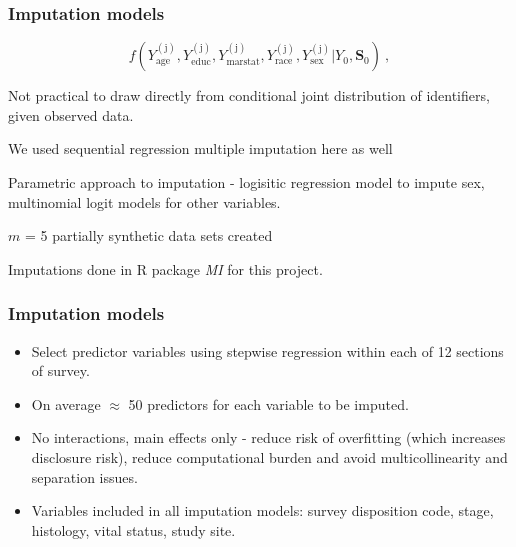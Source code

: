 \documentclass[11pt,handout]{beamer}
\begin{document}
\begin{frame}
\frametitle{Imputation models}

\begin{equation}
f(Y^{\mathrm{(j)}}_{\mathrm{age}},Y^{\mathrm{(j)}}_{\mathrm{educ}},Y^{\mathrm{(j)}}_{\mathrm{marstat}},Y^{\mathrm{(j)}}_{\mathrm{race}},Y^{\mathrm{(j)}}_{\mathrm{sex}} \big | Y_0, \mathbf{S}_0) \ ,
\label{eq:jmpost}
\end{equation}

Not practical to draw directly from conditional joint distribution of identifiers, given observed data.


\smallskip

We used sequential regression multiple imputation here as well


\smallskip

Parametric approach to imputation  - logisitic regression model to impute sex, multinomial logit models for other variables.

\smallskip
$m$ = 5 partially synthetic data sets created 
\smallskip

Imputations done in \textsf{R} package \textsl{MI} for this project.  

\end{frame}

\begin{frame}
\frametitle{Imputation models}

\begin{itemize}
\item Select predictor variables using stepwise regression within each of 12 sections of survey.
\item On average $\approx$ 50 predictors for each variable to be imputed.

\item No interactions, main effects only - reduce risk of overfitting (which increases disclosure risk), reduce computational burden and avoid multicollinearity and separation issues.  

\item Variables included in all imputation models: survey disposition code, stage, histology, vital status, study site.

\end{itemize}

\end{frame}
\end{document}
